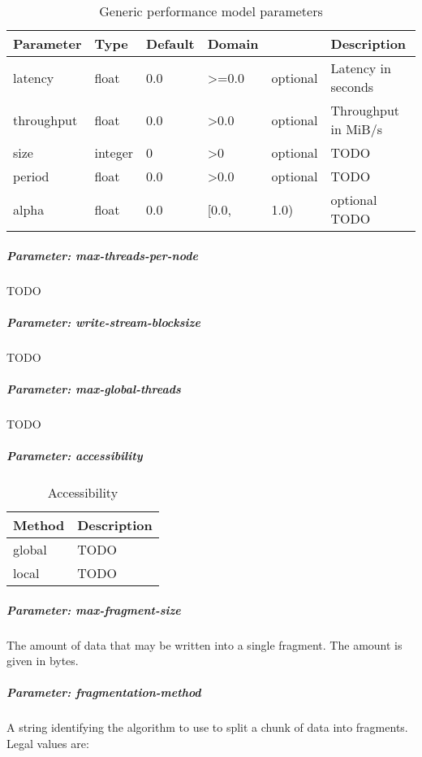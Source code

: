 \begin{table}[!ht]
  \begin{center}
    \begin{tabularx}{\textwidth}{lllllX}
      Parameter  & Type    & Default & Domain &          & Description         \\ 
      \hline
      latency    & float   & 0.0     & >=0.0  & optional & Latency in seconds  \\ 
      throughput & float   & 0.0     & >0.0   & optional & Throughput in MiB/s \\ 
      size       & integer & 0       & >0     & optional & TODO                \\ 
      period     & float   & 0.0     & >0.0   & optional & TODO                \\ 
      alpha      & float   & 0.0     & [0.0,  & 1.0)     & optional TODO       \\ 
    \end{tabularx}
  \end{center}
  \caption{Generic performance model parameters}%
  \label{tab:gen_perf_model_conf_params}
\end{table}



\subparagraph{Parameter: max-threads-per-node}
TODO

\subparagraph{Parameter: write-stream-blocksize}
TODO

\subparagraph{Parameter: max-global-threads}
TODO

\subparagraph{Parameter: accessibility}

\begin{table}[!ht]
  \begin{center}
    \begin{tabularx}{\textwidth}{lX}
      Method & Description \\ 
      \hline
      global & TODO        \\ 
      local  & TODO        \\ 
    \end{tabularx}
  \end{center}
  \caption{Accessibility}%
  \label{tab:accessibility}
\end{table}

\subparagraph{Parameter: max-fragment-size}
The amount of data that may be written into a single fragment. 
The amount is given in bytes.

\subparagraph{Parameter: fragmentation-method}
A string identifying the algorithm to use to split a chunk of data into fragments. 
Legal values are:

